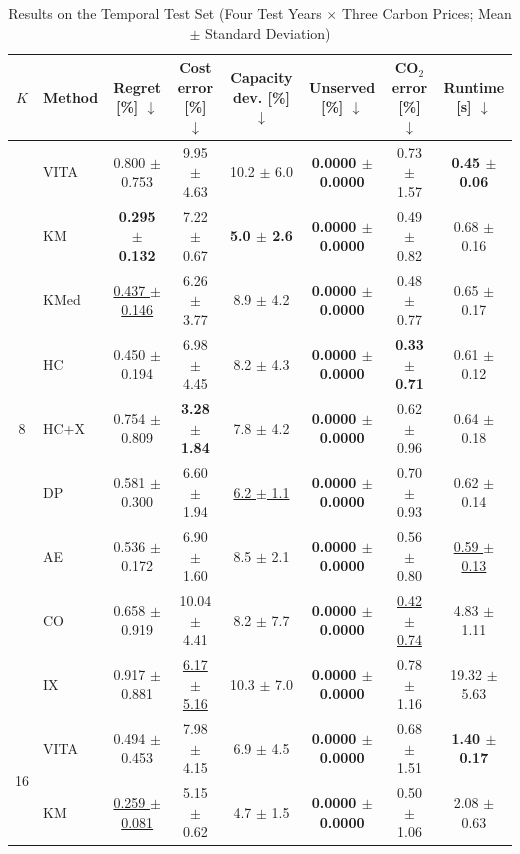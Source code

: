 \begin{table}[!t]
\centering
\caption{Results on the Temporal Test Set (Four Test Years $\times$ Three Carbon Prices; Mean $\pm$ Standard Deviation)\label{tab:main}}
\footnotesize
\setlength{\tabcolsep}{4.5pt}
\begin{tabular}{@{}clcccccc@{}}
\toprule
$K$ & Method & Regret [\%] $\downarrow$ & Cost error [\%] $\downarrow$ & Capacity dev. [\%] $\downarrow$ & Unserved [\%] $\downarrow$ & CO$_2$ error [\%] $\downarrow$ & Runtime [s] $\downarrow$ \\
\midrule
\multirow{9}{*}{8} & VITA & 0.800 $\pm$ 0.753 & 9.95 $\pm$ 4.63 & 10.2 $\pm$ 6.0 & \textbf{0.0000 $\pm$ 0.0000} & 0.73 $\pm$ 1.57 & \textbf{0.45 $\pm$ 0.06} \\
 & KM & \textbf{0.295 $\pm$ 0.132} & 7.22 $\pm$ 0.67 & \textbf{5.0 $\pm$ 2.6} & \textbf{0.0000 $\pm$ 0.0000} & 0.49 $\pm$ 0.82 & 0.68 $\pm$ 0.16 \\
 & KMed & \underline{0.437 $\pm$ 0.146} & 6.26 $\pm$ 3.77 & 8.9 $\pm$ 4.2 & \textbf{0.0000 $\pm$ 0.0000} & 0.48 $\pm$ 0.77 & 0.65 $\pm$ 0.17 \\
 & HC & 0.450 $\pm$ 0.194 & 6.98 $\pm$ 4.45 & 8.2 $\pm$ 4.3 & \textbf{0.0000 $\pm$ 0.0000} & \textbf{0.33 $\pm$ 0.71} & 0.61 $\pm$ 0.12 \\
 & HC+X & 0.754 $\pm$ 0.809 & \textbf{3.28 $\pm$ 1.84} & 7.8 $\pm$ 4.2 & \textbf{0.0000 $\pm$ 0.0000} & 0.62 $\pm$ 0.96 & 0.64 $\pm$ 0.18 \\
 & DP & 0.581 $\pm$ 0.300 & 6.60 $\pm$ 1.94 & \underline{6.2 $\pm$ 1.1} & \textbf{0.0000 $\pm$ 0.0000} & 0.70 $\pm$ 0.93 & 0.62 $\pm$ 0.14 \\
 & AE & 0.536 $\pm$ 0.172 & 6.90 $\pm$ 1.60 & 8.5 $\pm$ 2.1 & \textbf{0.0000 $\pm$ 0.0000} & 0.56 $\pm$ 0.80 & \underline{0.59 $\pm$ 0.13} \\
 & CO & 0.658 $\pm$ 0.919 & 10.04 $\pm$ 4.41 & 8.2 $\pm$ 7.7 & \textbf{0.0000 $\pm$ 0.0000} & \underline{0.42 $\pm$ 0.74} & 4.83 $\pm$ 1.11 \\
 & IX & 0.917 $\pm$ 0.881 & \underline{6.17 $\pm$ 5.16} & 10.3 $\pm$ 7.0 & \textbf{0.0000 $\pm$ 0.0000} & 0.78 $\pm$ 1.16 & 19.32 $\pm$ 5.63 \\
\midrule
\multirow{9}{*}{16} & VITA & 0.494 $\pm$ 0.453 & 7.98 $\pm$ 4.15 & 6.9 $\pm$ 4.5 & \textbf{0.0000 $\pm$ 0.0000} & 0.68 $\pm$ 1.51 & \textbf{1.40 $\pm$ 0.17} \\
 & KM & \underline{0.259 $\pm$ 0.081} & 5.15 $\pm$ 0.62 & 4.7 $\pm$ 1.5 & \textbf{0.0000 $\pm$ 0.0000} & 0.50 $\pm$ 1.06 & 2.08 $\pm$ 0.63 \\

\end{tabular}
\end{table}
